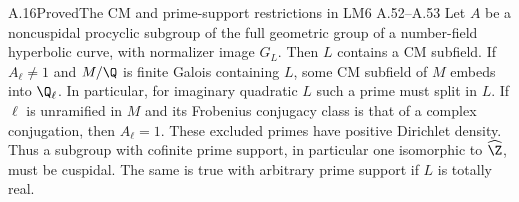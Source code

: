 \begin{statement}{A.16}{Proved}{The CM and prime-support restrictions in LM6 A.52--A.53}
Let $A$ be a noncuspidal procyclic subgroup of the full geometric
group of a number-field hyperbolic curve, with normalizer image
$G_L$. Then $L$ contains a CM subfield. If $A_\ell\ne1$ and
$M/\Q$ is finite Galois containing $L$, some CM subfield of $M$
embeds into $\Q_\ell$. In particular, for imaginary quadratic
$L$ such a prime must split in $L$.
If $\ell$ is unramified in $M$ and its Frobenius conjugacy class
is that of a complex conjugation, then $A_\ell=1$. These excluded
primes have positive Dirichlet density. Thus a subgroup with
cofinite prime support, in particular one isomorphic to
$\widehat\Z$, must be cuspidal. The same is true with arbitrary
prime support if $L$ is totally real.
\end{statement}
